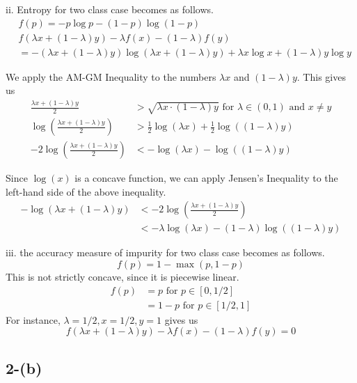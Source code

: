 \documentclass{article}
\begin{document}
ii. Entropy for two class case becomes as follows.
\begin{align*}
    & f(p) = - p\log p - (1-p)\log(1-p) \\
    & f(\lambda x + (1-\lambda)y) - \lambda f(x) - (1-\lambda)f(y) \\
    &= -(\lambda x + (1-\lambda) y) \log (\lambda x + (1-\lambda) y) + \lambda x \log x + (1-\lambda) y \log y 
\end{align*}


We apply the AM-GM Inequality to the numbers \(\lambda x\) and \((1 - \lambda)y\). This gives us
\begin{align*}
    \frac{\lambda x + (1 - \lambda)y}{2} &> \sqrt{\lambda x \cdot (1 - \lambda)y} \text{ for } \lambda \in (0, 1) \text{ and } x \neq y \\
    \log\left(\frac{\lambda x + (1 - \lambda)y}{2}\right) &> \frac{1}{2} \log(\lambda x) + \frac{1}{2} \log((1 - \lambda)y) \\
    -2\log\left(\frac{\lambda x + (1 - \lambda)y}{2}\right) &< -\log(\lambda x) - \log((1 - \lambda)y)
\end{align*}


Since \(\log(x)\) is a concave function, we can apply Jensen's Inequality to the left-hand side of the above inequality.
\begin{align*}
    -\log\left(\lambda x + (1 - \lambda)y\right) &< -2\log\left(\frac{\lambda x + (1 - \lambda)y}{2}\right) \\
    &< -\lambda \log(\lambda x) - (1 - \lambda) \log((1 - \lambda)y)
\end{align*}


iii. the accuracy measure of impurity for two class case becomes as follows.
\[
  f(p) = 1 - \max(p, 1-p)  
\]
This is not strictly concave, since it is piecewise linear. 
\begin{align*}
    f(p) &= p \text{ for } p \in [0, 1/2] \\
        &= 1 - p \text{ for } p \in [1/2, 1]
\end{align*}
For instance, \(\lambda = 1/2, x = 1/2, y = 1\) gives us 
\[
    f(\lambda x + (1-\lambda)y) - \lambda f(x) - (1-\lambda)f(y) = 0
\]




\subsection*{2-(b)}
\end{document}
